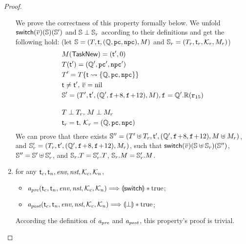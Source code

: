 \begin{proof}
\begin{enumerate}
        We prove the correctness of this property formally 
        below. We unfold $\mathsf{switch}(\overline{v})(\mathbb{S})(\mathbb{S}')$ 
        and $\mathbb{S}\perp\mathbb{S}_r$ according to their definitions 
        and get the following hold: 
        (let $\mathbb{S} = (T, \textsf{t}, (\mathbb{Q}, \texttt{pc}, \texttt{npc}), M)$ and 
        $\mathbb{S}_r = (T_r, \textsf{t}_r, \mathcal{K}_r, M_r)$)
        \begin{align}
            & M(\mathsf{TaskNew}) = (\textsf{t}', 0) \\
            & T(\textsf{t}') = (\mathbb{Q}', \texttt{pc}', \texttt{npc}') \\
            & T' = T\{ \textsf{t} \leadsto \{ \mathbb{Q}, \texttt{pc}, \texttt{npc} \} \} \\
            & \textsf{t} \neq \textsf{t}', \, \overline{v} = \text{nil} \\
            & \mathbb{S}' = (T', \textsf{t}', (\mathbb{Q}', \texttt{f}_{}\!+\!8, \texttt{f}_{}\!+\!12), 
                M{}), \texttt{f}_{} = \mathbb{Q}'.\mathbb{R}(\texttt{r}_{15}) \\
            & \notag \\[-5pt]
            & T \perp T_r, \, M \perp M_r \\
            & \textsf{t}_r = \textsf{t}, \, \mathcal{K}_r = (\mathbb{Q}, \texttt{pc}, \texttt{npc})
        \end{align}
        We can prove that there exists 
        $\mathbb{S}'' = (T'\uplus T_r, \textsf{t}', 
            (\mathbb{Q}', \texttt{f}_{}\!+\!8, \texttt{f}_{}\!+\!12), M\uplus M_r)$, 
        and 
        $\mathbb{S}_r' = (T_r, \textsf{t}', 
            (\mathbb{Q}', \texttt{f}_{}\!+\!8, \texttt{f}_{}\!+\!12), M_r)$, 
        such that 
        $\mathsf{switch}(\overline{v})(\mathbb{S} \uplus \mathbb{S}_r)(\mathbb{S}'')$,
        $\mathbb{S}'' = \mathbb{S}' \uplus \mathbb{S}_r'$, 
        and $\mathbb{S}_r.T = \mathbb{S}_r'.T$, 
        $\mathbb{S}_r.M = \mathbb{S}_r'.M$.
        \vspace*{0.5em}
        
        \item for any $\textsf{t}_c, \textsf{t}_n, \textit{env}, \textit{nst}, \mathcal{K}_c, \mathcal{K}_n$,
            \begin{itemize}
                \item $\textit{a}_\textit{pre}(\textsf{t}_c, \textsf{t}_n, \textit{env}, \textit{nst}, \mathcal{K}_c, \mathcal{K}_n) 
                    \Longrightarrow \llparenthesis {\mathsf{switch}} \rrparenthesis * \text{true}$; 
                \item $\textit{a}_\textit{post}(\textsf{t}_c, \textsf{t}_n, \textit{env}, \textit{nst}, \mathcal{K}_c, \mathcal{K}_n) 
                    \Longrightarrow \llparenthesis {\perp} \rrparenthesis * \text{true}$; 
            \end{itemize}   
        \vspace*{0.3em}
        According the definition of $\textit{a}_\textit{pre}$ and $\textit{a}_\textit{post}$, 
        this property's proof is trivial.
        \vspace*{0.5em}
        

\end{enumerate}
\end{proof}
